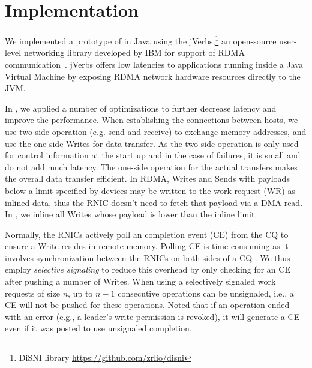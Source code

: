 \section{Implementation}
\label{sec:implementation}

%

We implemented a prototype of \libname in Java using the jVerbs,\footnote{DiSNI
library \url{https://github.com/zrlio/disni}} an
open-source user-level networking library developed by IBM for support of RDMA
communication~\cite{stuedi2013jverbs}. jVerbs offers low latencies to applications running inside a Java
Virtual Machine by exposing RDMA network hardware resources directly to the JVM.

In \libname, we applied a number of optimizations to further decrease latency
and improve the performance. When establishing the connections between hosts, we
use two-side operation (e.g. send and receive) to exchange memory addresses, and
use the one-side Writes for data transfer. As the two-side operation is only
used for control information at the start up and in the case of failures, it is
small and do not add much latency. The one-side operation for the actual
transfers makes the overall data transfer efficient. In RDMA, Writes and Sends
with payloads below a limit specified by devices may be written to the work
request (WR) as inlined data, thus the RNIC doesn't need to fetch that payload
via a DMA read. In \libname, we inline all Writes whose payload is lower than
the inline limit. 

Normally, the RNICs actively poll an completion event (CE) from the CQ to ensure
a Write resides in remote memory. Polling CE is time consuming as it involves
synchronization between the RNICs on both sides of a CQ \cite{APUS}. We thus
employ \emph{selective signaling} \cite{Kalia2014} to reduce this overhead by
only checking for an CE after pushing a number of Writes. When using a
selectively signaled work requests of size $n$, up to $n-1$ consecutive
operations can be unsignaled, i.e., a CE will not be pushed for these
operations. Noted that if an operation ended with an error (e.g., a leader's
write permission is revoked), it will generate a CE even if it was posted to use
unsignaled completion.

